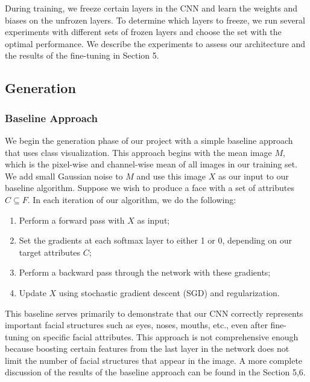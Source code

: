 \documentclass[10pt,twocolumn,letterpaper]{article}
\begin{document}
During training, we freeze certain layers in the CNN and learn the weights and biases on the unfrozen layers. To determine which layers to freeze, we run several experiments with different sets of frozen layers and choose the set with the optimal performance. We describe the experiments to assess our architecture and the results of the fine-tuning in Section 5.  


\subsection{Generation}
\subsubsection{Baseline Approach}
We begin the generation phase of our project with a simple baseline approach that uses class visualization.
This approach begins with the mean image $M$, which is the pixel-wise and channel-wise mean of all images in our training set. We add small Gaussian noise to $M$ and use this image $X$ as our input to our baseline algorithm. Suppose we wish to produce a face with a set of attributes $C\subseteq F$. In each iteration of our algorithm, we do the following: 
    \begin{enumerate}
        \item Perform a forward pass with $X$ as input;
        \item Set the gradients at each softmax layer to either 1 or 0, depending on our target attributes $C$;
        \item Perform a backward pass through the network with these gradients;
        \item Update $X$ using stochastic gradient descent (SGD) and regularization.
    \end{enumerate}
This baseline serves primarily to demonstrate that our CNN correctly represents important facial structures such as eyes, noses, mouths, etc., even after fine-tuning on specific facial attributes.
This approach is not comprehensive enough because boosting certain features from the last layer in the network does not limit the number of facial structures that appear in the image.
A more complete discussion of the results of the baseline approach can be found in the Section 5,6.
\end{document}
